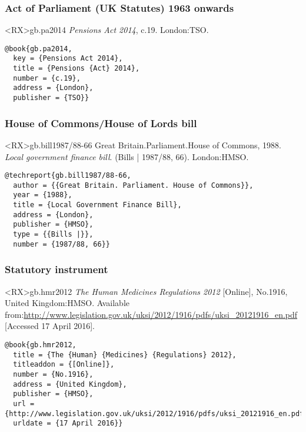 \documentclass[10pt,a4paper]{article}
\begin{document}
\subsubsection*{Act of Parliament (UK Statutes) 1963 onwards}

\begin{bibexbox}<RX>{gb.pa2014}
  \emph{Pensions Act 2014}, c.19. London:\@ TSO.
  \tcblower
\begin{Verbatim}
@book{gb.pa2014,
  key = {Pensions Act 2014},
  title = {Pensions {Act} 2014},
  number = {c.19},
  address = {London},
  publisher = {TSO}}
\end{Verbatim}
\end{bibexbox}

\subsubsection*{House of Commons/House of Lords bill}

\begin{bibexbox}<RX>{gb.bill1987/88-66}
  Great Britain.\@ Parliament.\@ House of Commons, 1988. \emph{Local government finance bill}. (Bills | 1987/88, 66). London:\@ HMSO.
  \tcblower
\begin{Verbatim}
@techreport{gb.bill1987/88-66,
  author = {{Great Britain. Parliament. House of Commons}},
  year = {1988},
  title = {Local Government Finance Bill},
  address = {London},
  publisher = {HMSO},
  type = {{Bills |}},
  number = {1987/88, 66}}
\end{Verbatim}
\end{bibexbox}


\subsubsection*{Statutory instrument}

\begin{bibexbox}<RX>{gb.hmr2012}
  \emph{The Human Medicines Regulations 2012} [Online], No.1916, United Kingdom:\@ HMSO. Available from:\@ \url{http://www.legislation.gov.uk/uksi/2012/1916/pdfs/uksi_20121916_en.pdf} [Accessed 17 April 2016].
  \tcblower
\begin{Verbatim}
@book{gb.hmr2012,
  title = {The {Human} {Medicines} {Regulations} 2012},
  titleaddon = {[Online]},
  number = {No.1916},
  address = {United Kingdom},
  publisher = {HMSO},
  url = {http://www.legislation.gov.uk/uksi/2012/1916/pdfs/uksi_20121916_en.pdf},
  urldate = {17 April 2016}}
\end{Verbatim}
\end{bibexbox}
\end{document}
